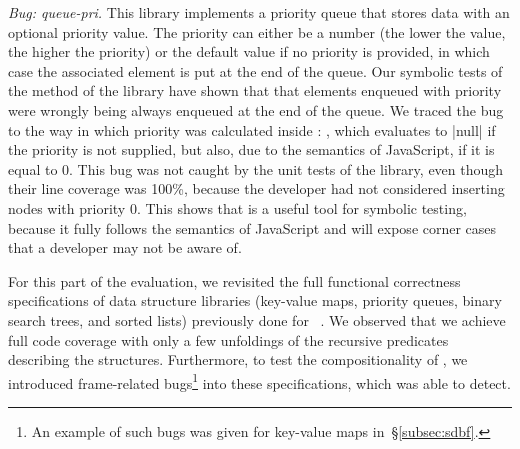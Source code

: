 \smallskip
\noindent \emph{Bug: queue-pri.} This library implements a priority queue that stores data with an optional priority value.
The priority can either be a number (the lower the value, the higher the priority) or the default  value if no priority is provided, in which case the associated element is put at the end of the queue. Our symbolic tests of the  method of the library have shown that that elements enqueued with priority  were wrongly being always enqueued at the end of the queue. We traced the bug to the way in which priority was calculated inside : , which evaluates to \jsinline|null| if the priority is not supplied, but also, due to the semantics of JavaScript, if it is equal to 0. This bug was not caught by the unit tests of the library, even though their line coverage was 100\%, because the developer had not considered inserting nodes with priority 0. This shows that \cosette is a useful tool for symbolic testing, because it fully follows the semantics of JavaScript and will expose corner cases that a developer may not be aware of.

 For this part of the evaluation, we revisited the full functional correctness specifications of data structure libraries (key-value maps, priority queues, binary search trees, and sorted lists) previously done for \javert~\cite{javert}. We observed that we achieve full code coverage with only a few unfoldings of the recursive predicates describing the structures. Furthermore, to test the compositionality of \cosette, we introduced frame-related bugs\footnote{An example of such bugs was given for key-value maps in~\S\ref{subsec:sdbf}.} into these specifications, which \cosette was able to detect.